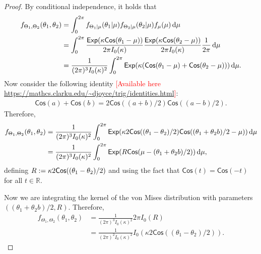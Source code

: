 \documentclass[oneside,11pt]{article}
\begin{document}
\begin{proof}
    By conditional independence, it holds that
    \begin{align*}
        f_{\Theta_1, \Theta_2}(\theta_1, \theta_2) &= \int_{0}^{2 \pi} f_{\Theta_1| \mu}(\theta_1 | \mu) f_{\Theta_2| \mu}(\theta_2 | \mu) f_{\mu}(\mu) \,\mathrm{d} \mu \\
        &= \int_{0}^{2 \pi} \frac{\mathsf{Exp}(\kappa \mathsf{Cos}(\theta_1 - \mu))}{2 \pi I_0(\kappa)} \frac{\mathsf{Exp}(\kappa \mathsf{Cos}(\theta_2 - \mu))}{2 \pi I_0(\kappa)} \frac{1}{2 \pi} \,\mathrm{d} \mu \\
        &= \frac{1}{(2 \pi)^3 I_0(\kappa)^2} \int_{0}^{2 \pi} \mathsf{Exp}(\kappa (\mathsf{Cos}(\theta_1 - \mu)+\mathsf{Cos}(\theta_2 - \mu))) \,\mathrm{d} \mu. \\
    \end{align*}
    Now consider the following identity \textcolor{red}{[Available here \url{https://mathcs.clarku.edu/~djoyce/trig/identities.html}]}:
    \begin{align*}
        \mathsf{Cos}(a) + \mathsf{Cos}(b) = 2  \mathsf{Cos}((a+b)/2)  \mathsf{Cos}((a-b)/2).
    \end{align*}
    Therefore,
    \begin{align*}
        f_{\Theta_1, \Theta_2}(\theta_1, \theta_2) &= \frac{1}{(2 \pi)^3 I_0(\kappa)^2} \int_{0}^{2 \pi} \mathsf{Exp}(\kappa 2  \mathsf{Cos}((\theta_1-\theta_2)/2)  \mathsf{Cos}((\theta_1+\theta_2b)/2 - \mu)) \,\mathrm{d} \mu \\
        &= \frac{1}{(2 \pi)^3 I_0(\kappa)^2} \int_{0}^{2 \pi} \mathsf{Exp}(R  \mathsf{Cos}(\mu - (\theta_1+\theta_2b)/2)) \,\mathrm{d} \mu, \\
    \end{align*}
    defining $R := \kappa 2  \mathsf{Cos}((\theta_1-\theta_2)/2)$ and using the fact that $\mathsf{Cos}(t) = \mathsf{Cos}(-t)$ for all $t \in \mathbb{R}$.

    Now we are integrating the kernel of the von Mises distribution with parameters $((\theta_1+\theta_2b)/2, R)$. Therefore,
    \begin{align*}
        f_{\Theta_1, \Theta_2}(\theta_1, \theta_2) &= \frac{1}{(2 \pi)^3 I_0(\kappa)^2} 2 \pi I_0(R) \\
        &= \frac{1}{(2 \pi)^2 I_0(\kappa)^2} I_0(\kappa 2  \mathsf{Cos}((\theta_1-\theta_2)/2)).
    \end{align*}


\end{proof}
\end{document}
